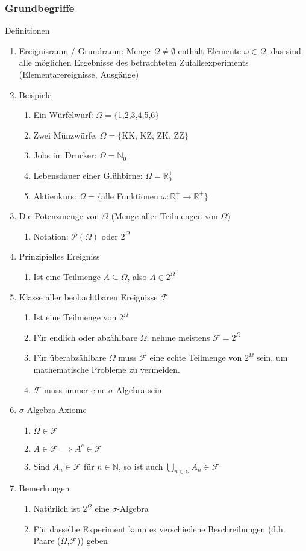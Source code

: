 \documentclass[10pt]{article}
\newcommand{\enumstart}{\begin{enumerate}}
\newcommand{\enumend}{\end{enumerate}}
\newcommand{\N}{\mathbb{N}}
\newcommand{\R}{\mathbb{R}}
\newcommand{\Pow}{\mathcal{P}}
\newcommand{\F}{\mathcal{F}}
\begin{document}
\subsubsection{Grundbegriffe}
Definitionen\\
\enumstart
	\item Ereignisraum / Grundraum: Menge $\Omega \neq \emptyset$ enthält Elemente $\omega \in \Omega$, das sind alle möglichen Ergebnisse des betrachteten Zufallsexperiments (Elementarereignisse, Ausgänge)
	\item Beispiele
	\enumstart
		\item Ein Würfelwurf: $\Omega = \{$1,2,3,4,5,6$\}$
		\item Zwei Münzwürfe: $\Omega = \{$KK, KZ, ZK, ZZ$\}$
		\item Jobs im Drucker: $\Omega = \N_0$
		\item Lebensdauer einer Glühbirne: $\Omega = \R^{+}_0$
		\item Aktienkurs: $\Omega = \{$alle Funktionen $\omega:\R^{+} \rightarrow \R^{+}\}$
	\enumend
	\item Die Potenzmenge von $\Omega$ (Menge aller Teilmengen von $\Omega$)
	\enumstart
		\item Notation: $\Pow(\Omega)$ oder $2^{\Omega}$
	\enumend
	\item Prinzipielles Ereigniss
	\enumstart
		\item Ist eine Teilmenge $A \subseteq \Omega$, also $A \in 2^{\Omega}$
	\enumend
	\item Klasse aller beobachtbaren Ereignisse $\F$
	\enumstart
		\item Ist eine Teilmenge von $2^{\Omega}$
		\item Für endlich oder abzählbare $\Omega$: nehme meistens $\F = 2^{\Omega}$
		\item Für überabzählbare $\Omega$ muss $\F$ eine echte Teilmenge von $2^{\Omega}$ sein, um mathematische Probleme zu vermeiden.
		\item $\F$ muss immer eine $\sigma$-Algebra sein
	\enumend
	\item $\sigma$-Algebra Axiome
	\enumstart
		\item $\Omega \in \F$
		\item $A \in \F \implies A^c \in \F$
		\item Sind $A_n \in \F$ für $n \in \N$, so ist auch $\bigcup_{n \in \N}A_n \in \F$
	\enumend
	\item Bemerkungen
	\enumstart
		\item Natürlich ist $2^{\Omega}$ eine $\sigma$-Algebra
		\item Für dasselbe Experiment kann es verschiedene Beschreibungen (d.h. Paare ($\Omega$,$\F$)) geben
	\enumend
\enumend
\end{document}
